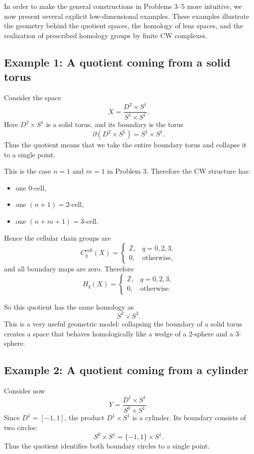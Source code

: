 \documentclass[12pt,a4paper]{article}
\theoremstyle{notespace}
\begin{document}
In order to make the general constructions in Problems 3--5 more intuitive, we now present several explicit low-dimensional examples. These examples illustrate the geometry behind the quotient spaces, the homology of lens spaces, and the realization of prescribed homology groups by finite CW complexes.

\subsection*{Example 1: A quotient coming from a solid torus}

Consider the space
\[
X=\frac{D^2\times S^1}{S^1\times S^1}.
\]
Here \(D^2\times S^1\) is a solid torus, and its boundary is the torus
\[
\partial(D^2\times S^1)=S^1\times S^1.
\]
Thus the quotient means that we take the entire boundary torus and collapse it to a single point.

This is the case \(n=1\) and \(m=1\) in Problem 3. Therefore the CW structure has:
\begin{itemize}
	\item one \(0\)-cell,
	\item one \((n+1)=2\)-cell,
	\item one \((n+m+1)=3\)-cell.
\end{itemize}
Hence the cellular chain groups are
\[
C_q^{\mathrm{cell}}(X)=
\begin{cases}
	\mathbb Z, & q=0,2,3,\\
	0, & \text{otherwise},
\end{cases}
\]
and all boundary maps are zero. Therefore
\[
H_q(X)=
\begin{cases}
	\mathbb Z, & q=0,2,3,\\
	0, & \text{otherwise}.
\end{cases}
\]

So this quotient has the same homology as
\[
S^2\vee S^3.
\]
This is a very useful geometric model: collapsing the boundary of a solid torus creates a space that behaves homologically like a wedge of a \(2\)-sphere and a \(3\)-sphere.

\subsection*{Example 2: A quotient coming from a cylinder}

Consider now
\[
Y=\frac{D^1\times S^1}{S^0\times S^1}.
\]
Since \(D^1=[-1,1]\), the product \(D^1\times S^1\) is a cylinder. Its boundary consists of two circles:
\[
S^0\times S^1=\{-1,1\}\times S^1.
\]
Thus the quotient identifies both boundary circles to a single point.
\end{document}
